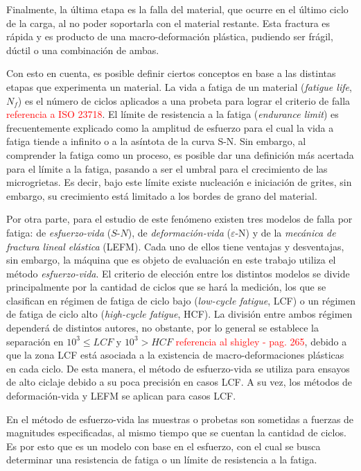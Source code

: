 Finalmente, la última etapa es la falla del material, que ocurre en el último ciclo de la carga, al no poder soportarla con el material restante. Esta fractura es rápida y es producto de una macro-deformación plástica, pudiendo ser frágil, dúctil o una combinación de ambas.

Con esto en cuenta, es posible definir ciertos conceptos en base a las distintas etapas que experimenta un material. La vida a fatiga de un material (\textit{fatigue life}, $N_f$) es el número de ciclos aplicados a una probeta para lograr el criterio de falla \textcolor{red}{referencia a ISO 23718}. El límite de resistencia a la fatiga (\textit{endurance limit}) es frecuentemente explicado como la amplitud de esfuerzo para el cual la vida a fatiga tiende a infinito o a la asíntota de la curva S-N. Sin embargo, al comprender la fatiga como un proceso, es posible dar una definición más acertada para el límite a la fatiga, pasando a ser el umbral para el crecimiento de las microgrietas. Es decir, bajo este límite existe nucleación e iniciación de grites, sin embargo, su crecimiento está limitado a los bordes de grano del material.

Por otra parte, para el estudio de este fenómeno existen tres modelos de falla por fatiga: de \textit{esfuerzo-vida} ($S$-$N$), de \textit{deformación-vida }($\varepsilon$-N) y de la \textit{mecánica de fractura lineal elástica} (LEFM). Cada uno de ellos tiene ventajas y desventajas, sin embargo, la máquina que es objeto de evaluación en este trabajo utiliza el método \textit{esfuerzo-vida}. El criterio de elección entre los distintos modelos se divide principalmente por la cantidad de ciclos que se hará la medición, los que se clasifican en régimen de fatiga de ciclo bajo (\textit{low-cycle fatigue}, LCF) o un régimen de fatiga de ciclo alto (\textit{high-cycle fatigue}, HCF). La división entre ambos régimen dependerá de distintos autores, no obstante, por lo general se establece la separación en $10^3 \leq LCF$ y $10^3 > HCF$ \textcolor{red}{referencia al shigley - pag. 265}, debido a que la zona LCF está asociada a la existencia de macro-deformaciones plásticas en cada ciclo. De esta manera, el método de esfuerzo-vida se utiliza para ensayos de alto ciclaje debido a su poca precisión en casos LCF. A su vez, los métodos de deformación-vida y LEFM se aplican para casos LCF.

En el método de esfuerzo-vida las muestras o probetas son sometidas a fuerzas de magnitudes especificadas, al mismo tiempo que se cuentan la cantidad de ciclos. Es por esto que es un modelo con base en el esfuerzo, con el cual se busca determinar una resistencia de fatiga o un límite de resistencia a la fatiga. 

